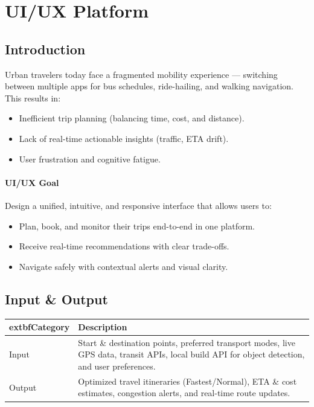 \section{UI/UX Platform}
\label{sec:uiux}
\subsection{Introduction}
Urban travelers today face a fragmented mobility experience --- switching between multiple apps for bus schedules, ride-hailing, and walking navigation. This results in:
\begin{itemize}
  \item Inefficient trip planning (balancing time, cost, and distance).
  \item Lack of real-time actionable insights (traffic, ETA drift).
  \item User frustration and cognitive fatigue.
\end{itemize}

\paragraph{UI/UX Goal} Design a unified, intuitive, and responsive interface that allows users to:
\begin{itemize}
  \item Plan, book, and monitor their trips end-to-end in one platform.
  \item Receive real-time recommendations with clear trade-offs.
  \item Navigate safely with contextual alerts and visual clarity.
\end{itemize}

\subsection{Input \& Output}
\renewcommand{\arraystretch}{1.12}
\begin{tabularx}{\textwidth}{|>{\raggedright\arraybackslash}p{2.4cm}|>{\raggedright\arraybackslash}X|}
\hline
	extbf{Category} & \textbf{Description} \\
\hline
Input & Start \& destination points, preferred transport modes, live GPS data, transit APIs, local build API for object detection, and user preferences. \\
\hline
Output & Optimized travel itineraries (Fastest/Normal), ETA \& cost estimates, congestion alerts, and real-time route updates. \\
\hline
\end{tabularx}

